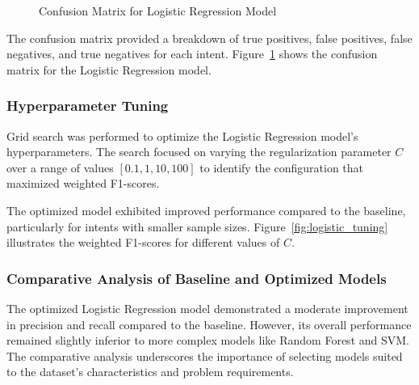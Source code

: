 \begin{figure}[h]
\begin{minipage}[c]{0.47\textwidth}
                    \caption{Confusion Matrix for Logistic Regression Model}
                    \label{fig:logistic_cm}
                \end{minipage}
            \end{figure}

            The confusion matrix provided a breakdown of true positives, false positives, false negatives, and true negatives for each intent. Figure~\ref{fig:logistic_cm} shows the confusion matrix for the Logistic Regression model.

        \subsubsection{Hyperparameter Tuning \\}

            Grid search was performed to optimize the Logistic Regression model's hyperparameters. The search focused on varying the regularization parameter \( C \) over a range of values \([0.1, 1, 10, 100]\) to identify the configuration that maximized weighted F1-scores.


            The optimized model exhibited improved performance compared to the baseline, particularly for intents with smaller sample sizes. Figure~\ref{fig:logistic_tuning} illustrates the weighted F1-scores for different values of \( C \).
            

        \subsubsection{Comparative Analysis of Baseline and Optimized Models \\}

            The optimized Logistic Regression model demonstrated a moderate improvement in precision and recall compared to the baseline. However, its overall performance remained slightly inferior to more complex models like Random Forest and SVM. The comparative analysis underscores the importance of selecting models suited to the dataset's characteristics and problem requirements.
            
